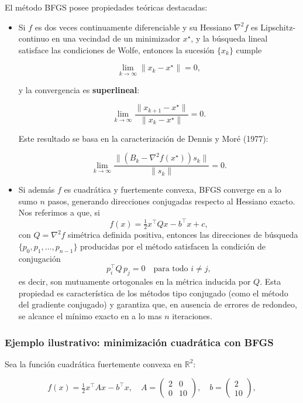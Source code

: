 \documentclass[
  spanish,
  us-letterpaper,
  DIV=11,
  numbers=noendperiod]{scrreprt}
\numberwithin{equation}{section}
\begin{document}
El método BFGS posee propiedades teóricas destacadas:

\begin{itemize}
\item
  Si \(f\) es dos veces continuamente diferenciable y su Hessiano
  \(\nabla^2 f\) es Lipschitz-continuo en una vecindad de un minimizador
  \(x^\star\), y la búsqueda lineal satisface las condiciones de Wolfe,
  entonces la sucesión \(\{x_k\}\) cumple

  \[
  \lim_{k \to \infty} \|x_k - x^\star\| = 0,
  \]

  y la convergencia es \textbf{superlineal}:

  \[
  \lim_{k \to \infty} \frac{\|x_{k+1} - x^\star\|}{\|x_k - x^\star\|} = 0.
  \]

  Este resultado se basa en la caracterización de Dennis y Moré (1977):

  \[
  \lim_{k \to \infty} \frac{\|(B_k - \nabla^2 f(x^\star)) s_k\|}{\|s_k\|} = 0.
  \]
\item
  Si además \(f\) es cuadrática y fuertemente convexa, BFGS converge en
  a lo sumo \(n\) pasos, generando direcciones conjugadas respecto al
  Hessiano exacto. Nos referimos a que, si \[
  f(x) = \tfrac{1}{2} x^\top Q x - b^\top x + c,
  \] con \(Q = \nabla^2 f\) simétrica definida positiva, entonces las
  direcciones de búsqueda \(\{p_0, p_1, \dots, p_{n-1}\}\) producidas
  por el método satisfacen la condición de conjugación \[
  p_i^\top Q\, p_j = 0 \quad \text{para todo } i \neq j,
  \] es decir, son mutuamente ortogonales en la métrica inducida por
  \(Q\). Esta propiedad es característica de los métodos tipo conjugado
  (como el método del gradiente conjugado) y garantiza que, en ausencia
  de errores de redondeo, se alcance el mínimo exacto en a lo mas \(n\)
  iteraciones.
\end{itemize}

\subsubsection{Ejemplo ilustrativo: minimización cuadrática con
BFGS}\label{ejemplo-ilustrativo-minimizaciuxf3n-cuadruxe1tica-con-bfgs}

Sea la función cuadrática fuertemente convexa en \(\mathbb{R}^2\):

\[
f(x) = \tfrac{1}{2}x^\top A x - b^\top x,
\quad
A = \begin{pmatrix} 2 & 0 \\ 0 & 10 \end{pmatrix},
\quad
b = \begin{pmatrix} 2 \\ 10 \end{pmatrix},
\]
\end{document}
